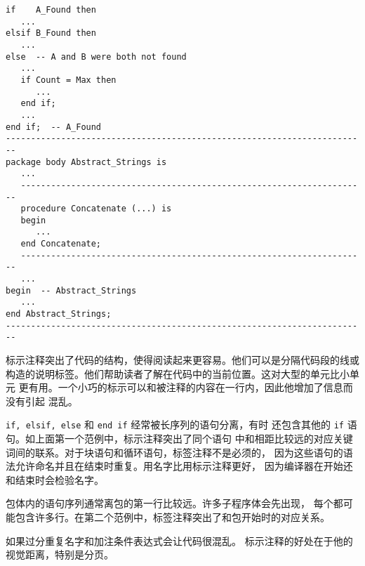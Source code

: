 \begin{blockindent}
\begin{lstlisting}
if    A_Found then
   ...
elsif B_Found then
   ...
else  -- A and B were both not found
   ...
   if Count = Max then
      ...
   end if;
   ...
end if;  -- A_Found
------------------------------------------------------------------------
package body Abstract_Strings is
   ...
   ---------------------------------------------------------------------
   procedure Concatenate (...) is
   begin
      ...
   end Concatenate;
   ---------------------------------------------------------------------
   ...
begin  -- Abstract_Strings
   ...
end Abstract_Strings;
------------------------------------------------------------------------
\end{lstlisting}
\end{blockindent}

\begin{blockindent}
标示注释突出了代码的结构，使得阅读起来更容易。他们可以是分隔代码段的线或
构造的说明标签。他们帮助读者了解在代码中的当前位置。这对大型的单元比小单元
更有用。一个小巧的标示可以和被注释的内容在一行内，因此他增加了信息而没有引起
混乱。

\texttt{if, elsif, else} 和 \texttt{end if} 经常被长序列的语句分离，有时
还包含其他的 \texttt{if} 语句。如上面第一个范例中，标示注释突出了同个语句
中和相距比较远的对应关键词间的联系。对于块语句和循环语句，标签注释不是必须的，
因为这些语句的语法允许命名并且在结束时重复。用名字比用标示注释更好，
因为编译器在开始还和结束时会检验名字。

包体内的语句序列通常离包的第一行比较远。许多子程序体会先出现，
每个都可能包含许多行。在第二个范例中，标签注释突出了和包开始时的对应关系。
\end{blockindent}

\begin{blockindent}
如果过分重复名字和加注条件表达式会让代码很混乱。
标示注释的好处在于他的视觉距离，特别是分页。
\end{blockindent}



